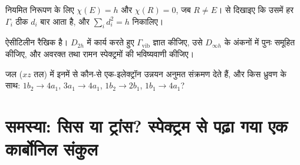\begin{exercise}[$\star\star\star$]\label{exo:b3:group-theory-applied:10}
नियमित निरूपण के लिए $\chi(E) = h$ और $\chi(R) = 0$, जब $R \ne E$।  से
दिखाइए कि उसमें हर  $\Gamma_i$ ठीक $d_i$ बार आता है, और $\sum_id_i^2 = h$ निकालिए।
\end{exercise}

\begin{exercise}[$\star\star\star$]\label{exo:b3:group-theory-applied:11}
ऐसीटिलीन  रैखिक है। $D_{2h}$ में कार्य करते हुए $\Gamma_{\mathrm{vib}}$ ज्ञात कीजिए, उसे
$D_{\infty h}$ के अंकनों में पुनः समूहित कीजिए, और अवरक्त तथा रामन स्पेक्ट्रमों की भविष्यवाणी कीजिए।
\end{exercise}

\begin{exercise}[$\star\star\star$]\label{exo:b3:group-theory-applied:12}
जल ($xz$ तल) में इनमें से कौन-से एक-इलेक्ट्रॉन उन्नयन अनुमत
संक्रमण देते हैं, और किस ध्रुवण के साथ: $1b_2 \to 4a_1$, $3a_1 \to 4a_1$,
$1b_2 \to 2b_1$, $1b_1 \to 4a_1$?
\end{exercise}

\section{समस्या: सिस या ट्रांस? स्पेक्ट्रम से पढ़ा गया एक कार्बोनिल संकुल}

